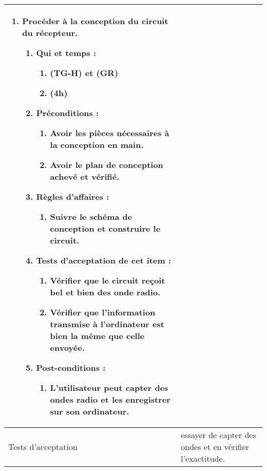 \begin{longtable}{|l|p{}|}
\begin{enumerate}[label*=\arabic*.]
\begin{enumerate}[label*=\arabic*.]
                \end{enumerate}
            \item Procéder à la conception du circuit du récepteur.
                \begin{enumerate}[label*=\arabic*.]
                    \item Qui et temps :
                    \begin{enumerate}[label*=\arabic*.]
                        \item (TG-H) et (GR)
                        \item (4h)
                    \end{enumerate}
                    \item Préconditions : 
                    \begin{enumerate}[label*=\arabic*.]
                        \item Avoir les pièces nécessaires à la conception en main.
                        \item Avoir le plan de conception achevé et vérifié.
                    \end{enumerate}
                    \item Règles d’affaires :
                    \begin{enumerate}[label*=\arabic*.]
                        \item Suivre le schéma de conception et construire le circuit.
                    \end{enumerate}
                    \item Tests d'acceptation de cet item :
                    \begin{enumerate}[label*=\arabic*.]
                        \item Vérifier que le circuit reçoit bel et bien des onde radio.
                        \item Vérifier que l'information transmise à l'ordinateur est bien la même que celle envoyée.
                    \end{enumerate}
                    \item Post-conditions :
                    \begin{enumerate}[label*=\arabic*.]
                        \item L'utilisateur peut capter des ondes radio et les enregistrer sur son ordinateur.
                    \end{enumerate}
                \end{enumerate}
        \end{enumerate} \\
\hline
    Tests d'acceptation & essayer de capter des ondes et en vérifier l'exactitude. \\


\end{longtable}
